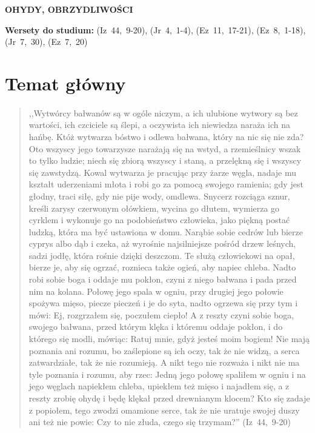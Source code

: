 \documentclass[10pt,a4paper,oneside]{article}
\begin{document}
\centerline{\textbf{\MakeUppercase{Ohydy, obrzydliwości}}}
\begin{center}
\textbf{Wersety do studium:} \mbox{(Iz 44, 9-20)}, \mbox{(Jr 4, 1-4)}, \mbox{(Ez 11, 17-21)}, \mbox{(Ez 8, 1-18)}, \mbox{(Jr 7, 30)}, \mbox{(Ez 7, 20)}
\end{center}
\section{Temat główny}
\paragraph{}
\begin{quote}
,,Wytwórcy bałwanów są w ogóle niczym, a ich ulubione wytwory są bez wartości, ich czciciele są ślepi, a oczywista ich niewiedza naraża ich na hańbę. Któż wytwarza bóstwo i odlewa bałwana, który na nic się nie zda? Oto wszyscy jego towarzysze narażają się na wstyd, a rzemieślnicy wszak to tylko ludzie; niech się zbiorą wszyscy i staną, a przelękną się i wszyscy się zawstydzą. Kowal wytwarza je pracując przy żarze węgla, nadaje mu kształt uderzeniami młota i robi go za pomocą swojego ramienia; gdy jest głodny, traci siłę, gdy nie pije wody, omdlewa. Snycerz rozciąga sznur, kreśli zarysy czerwonym ołówkiem, wycina go dłutem, wymierza go cyrklem i wykonuje go na podobieństwo człowieka, jako piękną postać ludzką, która ma być ustawiona w domu. Narąbie sobie cedrów lub bierze cyprys albo dąb i czeka, aż wyrośnie najsilniejsze pośród drzew leśnych, sadzi jodłę, która rośnie dzięki deszczom. Te służą człowiekowi na opał, bierze je, aby się ogrzać, roznieca także ogień, aby napiec chleba. Nadto robi sobie boga i oddaje mu pokłon, czyni z niego bałwana i pada przed nim na kolana. Połowę jego spala w ogniu, przy drugiej jego połowie spożywa mięso, piecze pieczeń i je do syta, nadto ogrzewa się przy tym i mówi: Ej, rozgrzałem się, poczułem ciepło! A z reszty czyni sobie boga, swojego bałwana, przed którym klęka i któremu oddaje pokłon, i do którego się modli, mówiąc: Ratuj mnie, gdyż jesteś moim bogiem! Nie mają poznania ani rozumu, bo zaślepione są ich oczy, tak że nie widzą, a serca zatwardziałe, tak że nie rozumieją. A nikt tego nie rozważa i nikt nie ma tyle poznania i rozumu, aby rzec: Jedną jego połowę spaliłem w ogniu i na jego węglach napiekłem chleba, upiekłem też mięso i najadłem się, a z reszty zrobię ohydę i będę klękał przed drewnianym klocem? Kto się zadaje z popiołem, tego zwodzi omamione serce, tak że nie uratuje swojej duszy ani też nie powie: Czy to nie złuda, czego się trzymam?'' \mbox{(Iz 44, 9-20)}
\end{quote}
\end{document}
